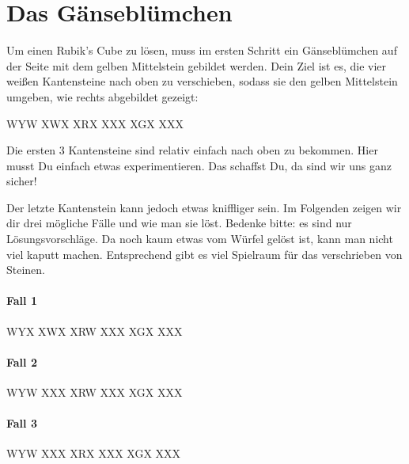 \section{Das Gänseblümchen}

\parbox{0.7\linewidth}{
  Um einen Rubik's Cube zu lösen, muss im ersten Schritt ein Gänseblümchen auf der Seite mit dem gelben Mittelstein gebildet werden.
  Dein Ziel ist es, die vier weißen Kantensteine nach oben zu verschieben, sodass sie den gelben Mittelstein umgeben, wie rechts abgebildet gezeigt:\\[1em]
} \parbox{0.3\linewidth}{
  \RubikCubeGreyAll%
	      {W}{Y}{W}
	      {X}{W}{X}%
		 {X}{R}{X}
		 {X}{X}{X}%
		 {X}{G}{X}
		 {X}{X}{X}%
  \\[1em]
}

Die ersten 3 Kantensteine sind relativ einfach nach oben zu bekommen.
Hier musst Du einfach etwas experimentieren.
Das schaffst Du, da sind wir uns ganz sicher!

Der letzte Kantenstein kann jedoch etwas kniffliger sein.
Im Folgenden zeigen wir dir drei mögliche Fälle und wie man sie löst.
Bedenke bitte: es sind nur Lösungsvorschläge.
Da noch kaum etwas vom Würfel gelöst ist, kann man nicht viel kaputt machen.
Entsprechend gibt es viel Spielraum für das verschrieben von Steinen.

\paragraph{Fall 1}
\RubikCubeGreyAll%
            {W}{Y}{X}
            {X}{W}{X}%
               {X}{R}{W}
	       {X}{X}{X}%
	       {X}{G}{X}
	       {X}{X}{X}%
\quad{}

\paragraph{Fall 2}
\RubikCubeGreyAll%
            {W}{Y}{W}
            {X}{X}{X}%
               {X}{R}{W}
	       {X}{X}{X}%
	       {X}{G}{X}
	       {X}{X}{X}%
\quad{}
\quad{}

\paragraph{Fall 3}
\RubikCubeGreyAll%
            {W}{Y}{W}
            {X}{X}{X}%
               {X}{R}{X}
	       {X}{X}{X}%
	       {X}{G}{X}
	       {X}{X}{X}%
\quad{}
\quad{}
\quad{}
